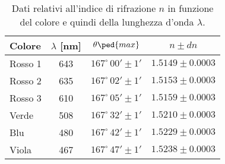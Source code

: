 \begin{table}[H]
    \centering
    \small
    \begin{tabular}{l c c c}
        \toprule
        Colore & $\lambda$ [nm] & $\theta\ped{max}$ & $n \pm dn$ \\
        \midrule
		Rosso 1	& 	643 &	$167^\circ \, 00' \pm 1'$ &	$1.5149 \pm 0.0003$ \\	
		Rosso 2	& 	635 &	$167^\circ \, 02' \pm 1'$ &	$1.5153 \pm 0.0003$ \\
		Rosso 3	& 	610 &	$167^\circ \, 05' \pm 1'$ &	$1.5159 \pm 0.0003$ \\
		Verde &		508 &	$167^\circ \, 32' \pm 1'$ &	$1.5210 \pm 0.0003$ \\
		Blu &		480 &	$167^\circ \, 42' \pm 1'$ &	$1.5229 \pm 0.0003$ \\
		Viola &		467 &	$167^\circ \, 47' \pm 1'$ &	$1.5238 \pm 0.0003$ \\
        \bottomrule
    \end{tabular}
    \caption{Dati relativi all'indice di rifrazione $n$ in funzione del colore e quindi della lunghezza d'onda $\lambda$.}
    \label{tab:enne}
\end{table}
